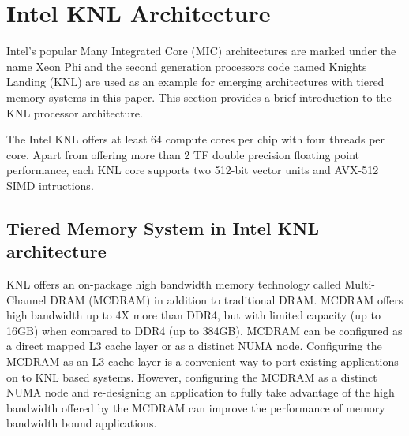 \section{Intel KNL Architecture}
\label{src:knl}

Intel's popular Many Integrated Core (MIC) architectures are marked
under the name Xeon Phi and the second generation processors code
named Knights Landing (KNL) are used as an example for emerging
architectures with tiered memory systems in this paper. This section
provides a brief introduction to the KNL processor architecture.

The Intel KNL offers at least 64 compute cores per chip with four
threads per core. Apart from offering more than 2 TF double precision
floating point performance, each KNL core supports two 512-bit vector
units and AVX-512 SIMD intructions.

\subsection{Tiered Memory System in Intel KNL architecture}
\label{src:knl/mmodel}
KNL offers an on-package high bandwidth memory technology
called Multi-Channel DRAM (MCDRAM) in addition to traditional DRAM.
MCDRAM offers high bandwidth up to 4X more than DDR4, but with
limited capacity (up to 16GB) when compared to DDR4 (up to 384GB).
MCDRAM can be configured as a direct mapped L3 cache layer or as a
distinct NUMA node. Configuring the MCDRAM as an L3 cache layer is a
convenient way to port existing applications on to KNL based systems.
However, configuring the MCDRAM as a distinct NUMA node and re-designing
an application to fully take advantage of the high bandwidth offered
by the MCDRAM can improve the performance of memory bandwidth bound
applications.
